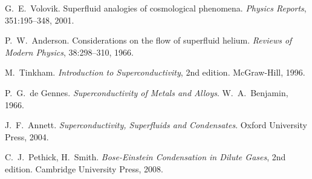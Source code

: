 \documentclass[12pt,a4paper]{article}
\theoremstyle{definition}
\theoremstyle{remark}
\begin{document}
\begin{thebibliography}{99}
G.~E.~Volovik.
\newblock Superfluid analogies of cosmological phenomena.
\newblock \emph{Physics Reports}, 351:195--348, 2001.

P.~W.~Anderson.
\newblock Considerations on the flow of superfluid helium.
\newblock \emph{Reviews of Modern Physics}, 38:298--310, 1966.

M.~Tinkham.
\newblock \emph{Introduction to Superconductivity}, 2nd edition.
\newblock McGraw-Hill, 1996.

P.~G.~de Gennes.
\newblock \emph{Superconductivity of Metals and Alloys}.
\newblock W.~A.~Benjamin, 1966.

J.~F.~Annett.
\newblock \emph{Superconductivity, Superfluids and Condensates}.
\newblock Oxford University Press, 2004.

C.~J.~Pethick, H.~Smith.
\newblock \emph{Bose-Einstein Condensation in Dilute Gases}, 2nd edition.
\newblock Cambridge University Press, 2008.

\end{thebibliography}
\end{document}
